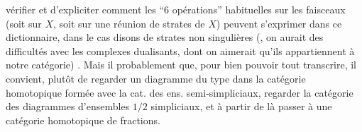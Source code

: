 vérifier et d'expliciter comment les ``6 opérations'' habituelles sur les faisceaux (soit sur $X$, soit sur une réunion de strates de $X$) peuvent s'exprimer dans ce dictionnaire, dans le cas disons de strates non singulières (, on aurait des difficultés avec les complexes dualisants, dont on aimerait qu'ils appartiennent à notre catégorie) . Mais il  probablement que, pour bien pouvoir tout transcrire, il convient, plutôt  de regarder un diagramme du type
\diagram{\begin{tikzcd}[ampersand replacement=\&,column sep=1.4em,row sep=1.2em]
\cdot \arrow[r] \arrow[d] \& {} \\
{} \& {}
\end{tikzcd}}
dans la catégorie homotopique formée avec la cat. des ens. semi-simpliciaux,  regarder la catégorie des diagrammes d'ensembles $1/2$ simpliciaux, et à partir de là passer à une catégorie homotopique de fractions.

